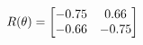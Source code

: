 \documentclass[preview]{standalone}
\begin{document}
\begin{align*}
\special{dvisvgm:raw <g id='unique000'>}R(\theta) = \begin{bmatrix}-0.75 & 0.66\\-0.66 & -0.75\end{bmatrix}\special{dvisvgm:raw </g>}
\end{align*}
\end{document}
